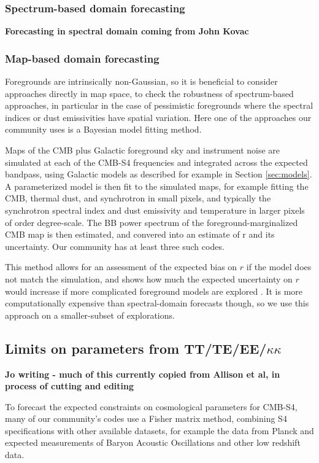 \subsubsection{Spectrum-based domain forecasting}
{\bf Forecasting in spectral domain coming from John Kovac}

\subsubsection{Map-based domain forecasting}

Foregrounds are intrinsically non-Gaussian, so it is beneficial to consider approaches directly in map space, to check the robustness of spectrum-based approaches, in particular in the case of pessimistic foregrounds where the spectral indices or dust emissivities have spatial variation. Here one of the approaches our community uses is a Bayesian model fitting method.

Maps of the CMB plus Galactic foreground sky and instrument noise are simulated at each of the CMB-S4 frequencies and integrated across the expected bandpass, using Galactic models as described for example in Section \ref{sec:models}. A parameterized model is then fit to the simulated maps, for example fitting the CMB, thermal dust, and synchrotron in small pixels, and typically the synchrotron spectral index and dust emissivity and temperature in larger pixels of order degree-scale. The BB power spectrum of the foreground-marginalized CMB map is then estimated, and convered into an estimate of r and its uncertainty. Our community has at least three such codes.

This method allows for an assessment of the expected bias on $r$ if the model does not match the simulation, and shows how much the expected uncertainty on $r$ would increase if more complicated foreground models are explored \citep[e.g. as in,][]{armitage-caplan/etal:2011,ramazeilles/etal:2015}. It is more computationally expensive than spectral-domain forecasts though, so we use this approach on a smaller-subset of explorations. 

\subsection{Limits on parameters from TT/TE/EE/$\kappa\kappa$}

{\bf Jo writing - much of this currently copied from Allison et al, in process of cutting and editing}

To forecast the expected constraints on cosmological parameters for CMB-S4, many of our community's codes use a Fisher matrix method, combining S4 specifications with other available datasets, for example the data from Planck and expected measurements of Baryon Acoustic Oscillations and other low redshift data. 

